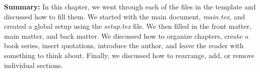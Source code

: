 \textbf{Summary:} In this chapter, we went through each of the files in the template and discussed how to fill them. We started with the main document, \textit{main.tex}, and created a global setup using the \textit{setup.tex} file. We then filled in the front matter, main matter, and back matter. We discussed how to organize chapters, create a book series, insert quotations, introduce the author, and leave the reader with something to think about. Finally, we discussed how to rearrange, add, or remove individual sections.